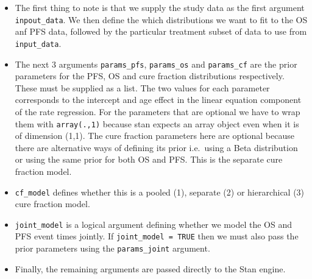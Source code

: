 \documentclass[
]{article}
\begin{document}
\begin{itemize}
\item
  The first thing to note is that we supply the study data as the first
  argument \texttt{inpout\_data}. We then define the which distributions
  we want to fit to the OS anf PFS data, followed by the particular
  treatment subset of data to use from \texttt{input\_data}.
\item
  The next 3 arguments \texttt{params\_pfs}, \texttt{params\_os} and
  \texttt{params\_cf} are the prior parameters for the PFS, OS and cure
  fraction distributions respectively. These must be supplied as a list.
  The two values for each parameter corresponds to the intercept and age
  effect in the linear equation component of the rate regression. For
  the parameters that are optional we have to wrap them with
  \texttt{array(.,1)} because stan expects an array object even when it
  is of dimension (1,1). The cure fraction parameters here are optional
  because there are alternative ways of defining its prior i.e.~using a
  Beta distribution or using the same prior for both OS and PFS. This is
  the separate cure fraction model.
\item
  \texttt{cf\_model} defines whether this is a pooled (1), separate (2)
  or hierarchical (3) cure fraction model.
\item
  \texttt{joint\_model} is a logical argument defining whether we model
  the OS and PFS event times jointly. If \texttt{joint\_model\ =\ TRUE}
  then we must also pass the prior parameters using the
  \texttt{params\_joint} argument.
\item
  Finally, the remaining arguments are passed directly to the Stan
  engine.
\end{itemize}
\end{document}
